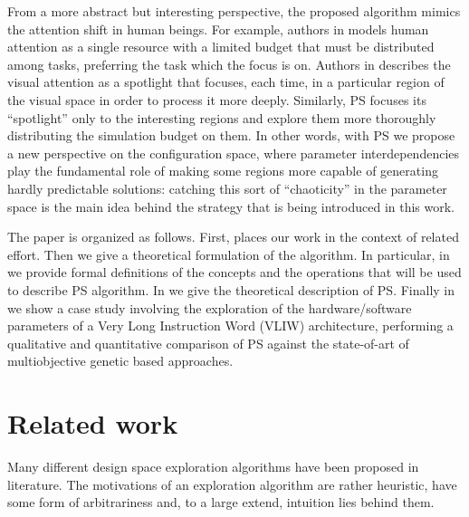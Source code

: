 From a more abstract but interesting perspective, the proposed
algorithm mimics the attention shift in human beings. For example,
authors in \cite{attention} models human attention as a single
resource with a limited budget that must be distributed among tasks,
preferring the task which the focus is on.  Authors in
\cite{spatial_attention} describes the visual attention as a spotlight
that focuses, each time, in a particular region of the visual space in
order to process it more deeply. Similarly, PS focuses its
``spotlight'' only to the interesting regions and explore them more
thoroughly distributing the simulation budget on them.
In other words, with PS we propose a new perspective on the configuration space,
where parameter interdependencies play the fundamental role of making
some regions more capable of generating hardly predictable solutions:
catching this sort of ``chaoticity'' in the parameter space is the
main idea behind the strategy that is being introduced in this work.


The paper is organized as follows. First,  places our work in the context of related effort.
Then we give a theoretical formulation of the algorithm. In particular, in  we provide formal definitions of the concepts and the operations that will be used to describe PS algorithm. In  we give the theoretical description of PS. 
Finally in  we show a case
study involving the exploration of the hardware/software parameters of
a Very Long Instruction Word (VLIW) architecture, performing a
qualitative and quantitative comparison of PS against the state-of-art
of multiobjective genetic based approaches.


\section{Related work}
Many different design space exploration algorithms have been proposed
in literature.  The motivations of an exploration
algorithm are rather heuristic, have some form of arbitrariness and,
to a large extend, intuition lies behind them.

